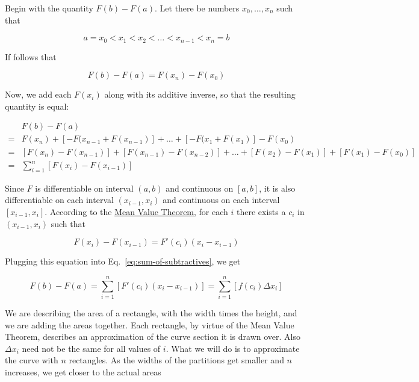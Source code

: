Begin with the quantity $F(b) - F(a)$. Let there be numbers $x_0, \ldots, x_n$ such that

\begin{equation}
    a = x_0 < x_1 < x_2 < \ldots < x_{n - 1} < x_n = b
\end{equation}

If follows that

\begin{equation}
    F(b) - F(a) = F(x_n) - F(x_0)
\end{equation}

Now, we add each $F(x_i)$ along with its additive inverse, so that the resulting quantity is equal:

\begin{align}
    &F(b) - F(a) \\
    ={}& F(x_n) + [-F(x_{n - 1} + F(x_{n - 1})] + \ldots + [-F(x_{1} + F(x_{1})] - F(x_0) \\
    ={}& [F(x_n) - F(x_{n - 1})] + [F(x_{n - 1}) - F(x_{n - 2})] + \ldots + [F(x_2) - F(x_1)] + [F(x_{1}) - F(x_0)] \\
    ={}& \sum_{i = 1}^n \left[ F(x_i) - F(x_{i - 1}) \right] \label{eq:sum-of-subtractives}
\end{align}

Since $F$ is differentiable on interval $(a, b)$ and continuous on $[a, b]$, it is also differentiable on each interval
$(x_{i - 1}, x_i)$ and continuous on each interval $[x_{i - 1}, x_i]$. According to the
\hyperlink{theo:mean-value-theorem}{Mean Value Theorem}, for each $i$ there exists a $c_i$ in $(x_{i - 1}, x_i)$ such
that

\begin{equation}
    F(x_i) - F(x_{i - 1}) = F'(c_i)(x_i - x_{i - 1})
\end{equation}

Plugging this equation into Eq.~\ref{eq:sum-of-subtractives}, we get

\begin{equation}
    F(b) - F(a) = \sum_{i = 1}^n \left[ F'(c_i)(x_i - x_{i - 1}) \right] = \sum_{i = 1}^n \left[ f(c_i)\Delta x_i \right]
\end{equation}

We are describing the area of a rectangle, with the width times the height, and we are adding the areas together. Each
rectangle, by virtue of the Mean Value Theorem, describes an approximation of the curve section it is drawn over. Also
$\Delta x_i$ need not be the same for all values of $i$. What we will do is to approximate the curve with $n$
rectangles. As the widths of the partitions get smaller and $n$ increases, we get closer to the actual areas

